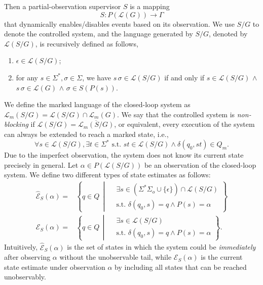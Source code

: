 \documentclass[twocolumn]{autart}
\def \L{\mathcal{L}}
\begin{document}
 
 


Then a partial-observation supervisor $S$ is a mapping 
\[
S : P(\mathcal{L}(G)) \to  \Gamma
\]
that dynamically enables/disables events based on its observation. 
We use $S / G$ to denote the controlled system, and the language generated by $S /G$, denoted by $\mathcal{L}(S / G)$, is recursively defined as follows,
\begin{enumerate} 
    \item $\epsilon \in \mathcal{L}(S / G)$;
    \item for any $s\in\Sigma^*,\sigma\in\Sigma$, we have
    $s \, \sigma \in \mathcal{L}(S / G)$ if and only if
    $s \in \mathcal{L}(S / G)$ $\wedge$ $s \, \sigma \in \mathcal{L}(G)$ $\wedge$ $\sigma \in S(P(s))$.
\end{enumerate}
We define the marked language of the closed-loop system  as $\mathcal{L}_m(S / G) = \mathcal{L}(S / G) \cap \mathcal{L}_m(G)$. 
We say that the controlled system is \emph{non-blocking} if 
$\L(S/G)=\overline{\L_m(S/G)}$, or equivalent, 
every execution of the system can always be extended to reach a marked state, i.e., 
\begin{equation}
    \forall s\in \L(S/G),\exists t\in \Sigma^* \text{ s.t. } st\in \L(S/G) \wedge \delta(q_0,st)\in Q_m.
\end{equation}
Due to the imperfect observation, the system does not know its current state precisely in general. 
Let $\alpha \in P(\L(S/G))$ be an observation of the closed-loop system. 
We define two different types of state estimates as follows:
\begin{align}
\hat{\mathcal{E}}_S(\alpha) 
= &\left\{ q\in Q \,\middle\vert\,
\begin{array}{cc}
     &  \exists s\in  (\Sigma^*\Sigma_o \cup\{\epsilon\}) \cap \mathcal{L}(S / G) \\
     & \text{s.t. }\delta(q_0, s) = q \wedge P(s) = \alpha
\end{array}
\right\}  \label{eq:immed_esti}\\ 
{\mathcal{E}}_S(\alpha) 
= &\left\{ q\in Q \,\middle\vert\,
\begin{array}{cc}
     &  \exists s\in \mathcal{L}(S / G) \\
     & \text{s.t. }\delta(q_0, s) = q \wedge P(s) = \alpha
\end{array}
\right\}. \label{eq:esti}
\end{align}
Intuitively, 
$\hat{\mathcal{E}}_S(\alpha) $ is the set of states in which the system could be \emph{immediately} after observing $\alpha$ without the unobservable tail, 
while 
${\mathcal{E}}_S(\alpha) $ is the current state estimate under observation $\alpha$ by including all states that can be reached unobservably. 
 
\end{document}
